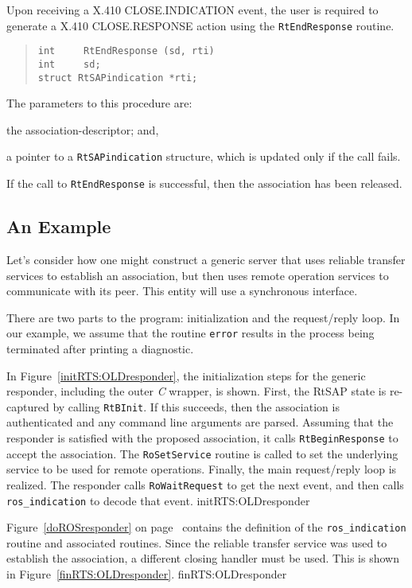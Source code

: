 Upon receiving a {\sf X.410 CLOSE.INDICATION\/} event,
the user is required to generate a {\sf X.410 CLOSE.RESPONSE\/} action
using the \verb"RtEndResponse" routine.
\begin{quote}\small\begin{verbatim}
int     RtEndResponse (sd, rti)
int     sd;
struct RtSAPindication *rti;
\end{verbatim}\end{quote}
The parameters to this procedure are:
\begin{describe}
\item[\verb"sd":] the association-descriptor;
and,

\item[\verb"rti":] a pointer to a \verb"RtSAPindication" structure, which is
updated only if the call fails.
\end{describe}
If the call to \verb"RtEndResponse" is successful,
then the association has been released.

\subsection	{An Example}
Let's consider how one might construct a generic server that uses
reliable transfer services to establish an association,
but then uses remote operation services to communicate with its peer.
This entity will use a synchronous interface.

There are two parts to the program:
initialization and the request/reply loop.
In our example,
we assume that the routine \verb"error" results in the process being
terminated after printing a diagnostic.

In Figure~\ref{initRTS:OLDresponder},
the initialization steps for the generic responder,
including the outer {\em C\/} wrapper,
is shown.
First, the RtSAP state is re-captured by calling \verb"RtBInit".
If this succeeds,
then the association is authenticated and any command line arguments
are parsed.
Assuming that the responder is satisfied with the proposed association,
it calls \verb"RtBeginResponse" to accept the association.
The \verb"RoSetService" routine is called to set the underlying service to be
used for remote operations.
Finally,
the main request/reply loop is realized.
The responder calls \verb"RoWaitRequest" to get the next event,
and then calls \verb"ros_indication" to decode that event.
{\let\small=\scriptsize			%
%
	{initRTS:OLDresponder}}

Figure~\ref{doROSresponder} on page~\pageref{doROSresponder}
contains the definition of the
\verb"ros_indication" routine and associated routines.
Since the reliable transfer service was used to establish the association,
a different closing handler must be used.
This is shown in Figure~\ref{finRTS:OLDresponder}.
{\let\small=\scriptsize			%
%
	{finRTS:OLDresponder}}
